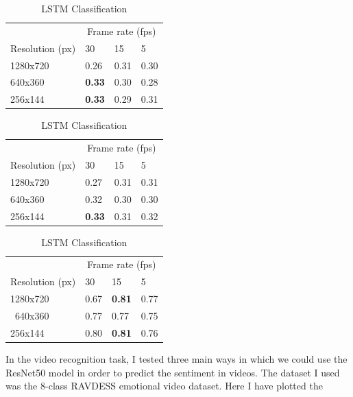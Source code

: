 \documentclass[sigconf]{acmart}
\begin{document}
{\begin{table}[h]
	\caption{Comparison of video classifiers accuracy on the RAVDESS dataset.}
	\label{tab:video}
	\begin{subtable}[b]{0.3\textwidth}
		\caption{Mean Classification}\label{tab:acc-mean}
		\begin{tabularx}{0.9\textwidth}{l X X X}
		&\multicolumn{3}{c}{Frame rate (fps)} \\\cmidrule{2-4}
		Resolution (px) &30 &15 &5 \\\cmidrule{1-4}
		1280x720 &0.26 &0.31 &0.30 \\
		640x360 &\textbf{0.33} &0.30 &0.28 \\
		256x144 &\textbf{0.33} &0.29 &0.31 \\
		\end{tabularx}
	\end{subtable}
	\begin{subtable}[b]{0.3\textwidth}
		\caption{Mode Classification}\label{tab:acc-mode}
		\begin{tabularx}{0.9\textwidth}{l X X X}
		&\multicolumn{3}{c}{Frame rate (fps)} \\\cmidrule{2-4}
		Resolution (px) &30 &15 &5 \\\cmidrule{1-4}
		1280x720 &0.27 &0.31 &0.31 \\
		640x360 &0.32 &0.30 &0.30 \\
		256x144 &\textbf{0.33} &0.31 &0.32 \\
		\end{tabularx}
	\end{subtable}
	\begin{subtable}[b]{0.3\textwidth}
		\caption{LSTM Classification}\label{tab:acc-lstm}
		\begin{tabularx}{0.9\textwidth}{l X X X}
		&\multicolumn{3}{c}{Frame rate (fps)} \\\cmidrule{2-4}
		Resolution (px) &30 &15 &5 \\\cmidrule{1-4}
		1280x720 &0.67 &\textbf{0.81} &0.77 \\\
		640x360 &0.77 &0.77 &0.75 \\
		256x144 &0.80 &\textbf{0.81} &0.76 \\
		\end{tabularx}
	\end{subtable}
\end{table}
In the video recognition task, I tested three main ways in which we could use
the ResNet50 model in order to predict the sentiment in videos. The dataset I
used was the 8-class RAVDESS emotional video dataset. Here I have plotted the
}
\end{document}
